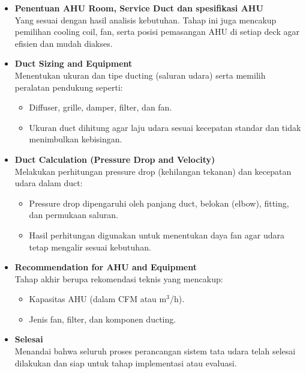 \documentclass[12pt,a4paper,twoside,openright]{book}
\theoremstyle{definition}
\theoremstyle{plain}
\theoremstyle{remark}
\begin{document}
\begin{itemize}
  \item \textbf{Penentuan AHU Room, Service Duct dan spesifikasi AHU} \\
  Yang sesuai dengan hasil analisis kebutuhan. Tahap ini juga mencakup pemilihan cooling coil, fan, serta posisi pemasangan AHU di setiap deck agar efisien dan mudah diakses.

  \item \textbf{Duct Sizing and Equipment} \\
  Menentukan ukuran dan tipe ducting (saluran udara) serta memilih peralatan pendukung seperti:
  \begin{itemize}
    \item Diffuser, grille, damper, filter, dan fan.
    \item Ukuran duct dihitung agar laju udara sesuai kecepatan standar dan tidak menimbulkan kebisingan.
  \end{itemize}

  \item \textbf{Duct Calculation (Pressure Drop and Velocity)} \\
  Melakukan perhitungan pressure drop (kehilangan tekanan) dan kecepatan udara dalam duct:
  \begin{itemize}
    \item Pressure drop dipengaruhi oleh panjang duct, belokan (elbow), fitting, dan permukaan saluran.
    \item Hasil perhitungan digunakan untuk menentukan daya fan agar udara tetap mengalir sesuai kebutuhan.
  \end{itemize}

  \item \textbf{Recommendation for AHU and Equipment} \\
  Tahap akhir berupa rekomendasi teknis yang mencakup:
  \begin{itemize}
    \item Kapasitas AHU (dalam CFM atau m$^3$/h).
    \item Jenis fan, filter, dan komponen ducting.
  \end{itemize}

  \item \textbf{Selesai} \\
  Menandai bahwa seluruh proses perancangan sistem tata udara telah selesai dilakukan dan siap untuk tahap implementasi atau evaluasi.
\end{itemize}


\end{document}
